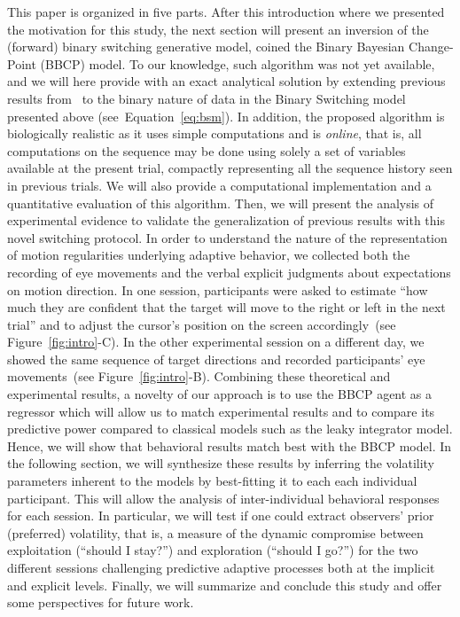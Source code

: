\documentclass[10pt,letterpaper]{article}
\newcommand{\citet}[1]{\cite{#1}}
\newcommand{\seeFig}[1]{Figure~\ref{fig:#1}}
\newcommand{\seeEq}[1]{Equation~\ref{eq:#1}}
\newcommand{\seeSec}[1]{Section~\ref{sec:#1}}
\begin{document}
This paper is organized in five parts.
After this introduction where we presented the motivation for this study,
the next section %
will present
an inversion of the (forward) binary switching generative model,
coined the Binary Bayesian Change-Point (BBCP) model.
To our knowledge, such algorithm was not yet available, and
we will here provide with an exact analytical solution
by extending previous results from~\citet{AdamsMackay2007}
to the binary nature of data in the Binary Switching model presented above (see~\seeEq{bsm}).
In addition, the proposed algorithm is biologically realistic
as it uses simple computations and is \emph{online},
that is, all computations on the sequence may be done
using solely a set of variables available at the present trial,
compactly representing all the sequence history seen in previous trials.
We will also provide a computational implementation
and a quantitative evaluation of this algorithm.
Then, we will present %
the analysis of experimental evidence
to validate the generalization of previous results %
with this novel switching protocol.
In order to understand the nature of
the representation of motion regularities underlying adaptive behavior,
we collected both
the recording of eye movements
and the verbal explicit judgments about expectations on motion direction.
In one session, participants were asked to estimate
``how much they are confident that
the target will move to the right or left in the next trial'' and
to adjust the cursor's position on the screen accordingly~(see \seeFig{intro}-C).
In the other experimental session on a different day,
we showed the same sequence of target directions and
recorded participants' eye movements~(see \seeFig{intro}-B).
Combining these theoretical and experimental results,
a novelty of our approach is to use the BBCP agent as a regressor
which will allow us to match experimental results
and to compare its predictive power compared to classical models such as the leaky integrator model.
Hence, we will show that behavioral results match best with the BBCP model.
In the following section, 
we will synthesize these results
by inferring the volatility parameters inherent to the models
by best-fitting it to each each individual participant.
This will allow the analysis of inter-individual behavioral responses for each session.
In particular, we will test if one could extract observers' prior (preferred) volatility,
that is, a measure of the dynamic compromise between
exploitation (``should I stay?'') and exploration (``should I go?'')
for the two different sessions challenging predictive adaptive processes
both at the implicit and explicit levels.
Finally, we will summarize and conclude this study and
offer some perspectives for future work. %
%
\end{document}

